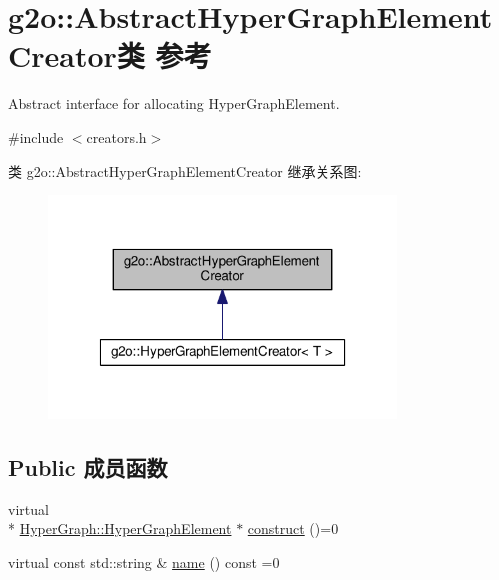 \hypertarget{classg2o_1_1AbstractHyperGraphElementCreator}{\section{g2o\-:\-:Abstract\-Hyper\-Graph\-Element\-Creator类 参考}
\label{classg2o_1_1AbstractHyperGraphElementCreator}
}


Abstract interface for allocating Hyper\-Graph\-Element.  




{\ttfamily \#include $<$creators.\-h$>$}



类 g2o\-:\-:Abstract\-Hyper\-Graph\-Element\-Creator 继承关系图\-:
\nopagebreak
\begin{figure}[H]
\begin{center}
\leavevmode
\includegraphics[width=262pt]{classg2o_1_1AbstractHyperGraphElementCreator__inherit__graph}
\end{center}
\end{figure}
\subsection*{Public 成员函数}
\begin{DoxyCompactItemize}
\item 
virtual \\*
\hyperlink{structg2o_1_1HyperGraph_1_1HyperGraphElement}{Hyper\-Graph\-::\-Hyper\-Graph\-Element} $\ast$ \hyperlink{classg2o_1_1AbstractHyperGraphElementCreator_a0b4722fa4b05465bf89d6e7fdc75b153}{construct} ()=0
\item 
virtual const std\-::string \& \hyperlink{classg2o_1_1AbstractHyperGraphElementCreator_a238928fbbfd6e473b2c61002112e6f5f}{name} () const =0
\end{DoxyCompactItemize}


